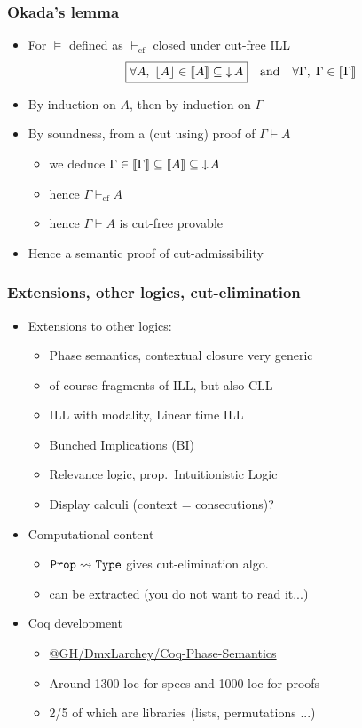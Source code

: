 \documentclass[xcolor=pdftex,graphicx=pdftex,12pt]{beamer}
\newcommand{\coq}[1]{\ensuremath{\mathalpha{\mathtt{#1}}}}
\newcommand{\sem}[1]{\llbracket{#1}\rrbracket}
\newcommand{\seq}{\mathrel\vdash}
\newcommand{\pable}{\mathrel{\models}}
\begin{document}
\begin{frame}

\frametitle{Okada's lemma}

\begin{itemize}
\item For ${\pable}$ defined as ${\seq_{\textrm{cf}}}$ closed under cut-free ILL
$$\fbox{$\forall A,\;\ulist A\in\sem A\subseteq\dc A$}\quad\text{and}\quad \forall\Gamma,\;\Gamma\in\sem\Gamma$$ 
\item By induction on $A$, then by induction on $\Gamma$
\item By soundness, from a (cut using) proof of $\Gamma\seq A$
  \begin{itemize}
  \item we deduce $\Gamma\in\sem\Gamma\subseteq\sem A\subseteq\dc A$
  \item hence $\Gamma \seq_{\textrm{cf}} A$
  \item hence $\Gamma\seq A$ is cut-free provable
  \end{itemize}
\item Hence a semantic proof of cut-admissibility
\end{itemize}

\end{frame}

\begin{frame}

\frametitle{Extensions, other logics, cut-elimination}

\begin{itemize}
\item Extensions to other logics:
  \begin{itemize}
  \item Phase semantics, contextual closure very generic
  \item of course fragments of ILL, but also CLL
  \item ILL with modality, Linear time ILL
  \item Bunched Implications (BI)
  \item Relevance logic, prop.\ Intuitionistic Logic
  \item Display calculi (context = consecutions)?
  \end{itemize}
\item Computational content
  \begin{itemize}
  \item $\coq{Prop} \rightsquigarrow \coq{Type}$ gives cut-elimination algo.
  \item can be extracted (you do not want to read it...)
  \end{itemize}
\item Coq development
  \begin{itemize}
  \item \url{@GH/DmxLarchey/Coq-Phase-Semantics}
  \item Around 1300 loc for specs and 1000 loc for proofs  
  \item 2/5 of which are libraries (lists, permutations ...)
  \end{itemize}
\end{itemize}

\end{frame}
\end{document}
